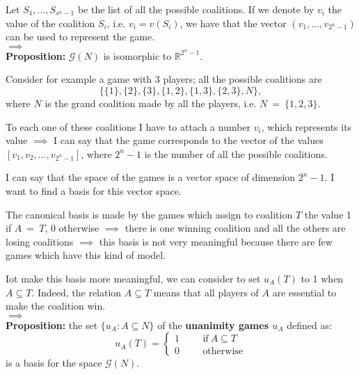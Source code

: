 \noindent Let $S_1,...,S_{s^n-1}$ be the list of all the possible coalitions. If we denote by $v_i$ the value of the coalition $S_i$, i.e. $v_i = v(S_i)$, we have that the vector $(v_1,...,v_{2^n-1})$ can be used to represent the game.\\
$\implies$\\
\textbf{Proposition:} $\mathcal{G}(N)$ is isomorphic to $\mathbb{R}^{2^n-1}$.

\bigskip
\noindent Consider for example a game with 3 players; all the possible 
coalitions are
\[
	\{\{1\}, \{2\}, \{3\}, \{1,2\}, \{1,3\}, \{2,3\}, N\},
\]
where $N$ is the grand coalition made by all the players, i.e. $N~=~\{1,2,3\}$.

\noindent To each one of these coalitions I have to attach a number $v_i$, 
which represents its value $\implies$ I can say that the game corresponds to the 
vector of the values $[v_1, v_2, ..., v_{2^n-1}]$, where $2^n-1$ is the 
number of all the possible coalitions.

\noindent I can say that the space of the games is a vector space of 
dimension $2^n-1$. I want to find a basis for this vector space.

\noindent The canonical basis is made by the games which assign to coalition 
$T$ the value 1 if $A~=~T$, 0 otherwise $\implies$ there is one winning coalition 
and all the others are losing coalitions $\implies$ this basis is not very 
meaningful because there are few games which have this kind of model.

\noindent Iot make this basis more meaningful, we can consider to set $u_A(T)$ 
to 1 when $A \subseteq T$. Indeed, the relation $A \subseteq T$ means that 
all players of $A$ are essential to make the coalition win.\\
$\implies$\\
\textbf{Proposition:} the set $\{u_A: A \subseteq N\}$ of the \textbf{unanimity games $u_A$} defined as:
\[
	u_A(T) = \begin{cases}
					1 \hspace{1cm} \text{if} ~A \subseteq T\\
					0 \hspace{1cm} \text{otherwise}
				  \end{cases}
\]
is a basis for the space $\mathcal{G}(N)$.

